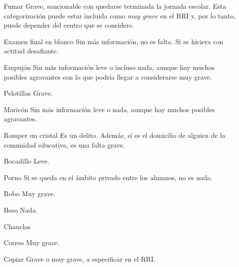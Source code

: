 \begin{enumerate}
	\item[Fumar] Grave, sancionable con quedarse terminada la jornada escolar.
	\subitem Esta categorización puede estar incluida como \textit{muy grave} en el RRI y, por lo tanto, puede depender del centro que se considere.
	\item[Examen final en blanco] Sin más información, no es falta. Si se hiciera con actitud desafiante.
	\item[Empujón] Sin más información leve o incluso nada, aunque hay muchos posibles agravantes con lo que podría llegar a considerarse muy grave.
	\item[Pelotillas] Grave.
	\item[Maricón] Sin más información leve o nada, aunque hay muchos posibles agravantes.
	\item[Romper un cristal] Es un delito. Además, si es el domicilio de alguien de la comunidad educativa, es una falta grave. 
	\item[Bocadillo] Leve.
	\item[Porno] Si se queda en el ámbito privado entre los alumnos, no es nada.
	\item[Robo] Muy grave.
	\item[Beso] Nada.
	\item[Chanclas] 
	\item[Correo] Muy grave.
	\item[Copiar] Grave o muy grave, a especificar en el RRI.
\end{enumerate}